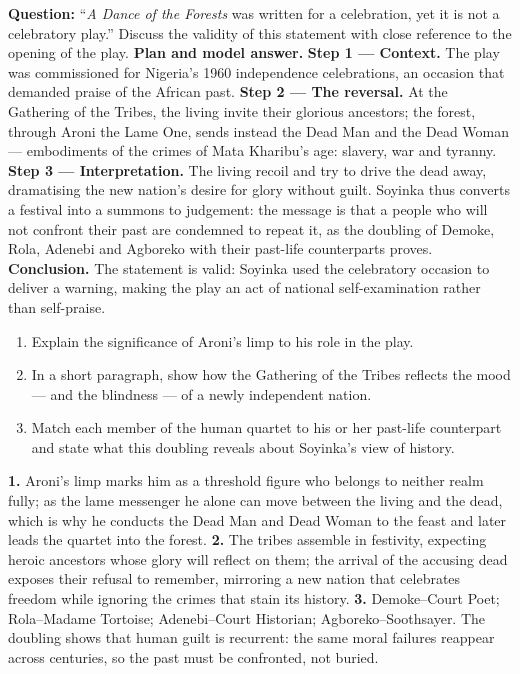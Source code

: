 \documentclass[11pt]{article}
\begin{document}
\begin{exoresolu}
\textbf{Question:} ``\emph{A Dance of the Forests} was written for a celebration, yet it is not a celebratory play.'' Discuss the validity of this statement with close reference to the opening of the play.
\tcblower
\textbf{Plan and model answer.} \textbf{Step 1 — Context.} The play was commissioned for Nigeria's 1960 independence celebrations, an occasion that demanded praise of the African past. \textbf{Step 2 — The reversal.} At the Gathering of the Tribes, the living invite their glorious ancestors; the forest, through Aroni the Lame One, sends instead the Dead Man and the Dead Woman — embodiments of the crimes of Mata Kharibu's age: slavery, war and tyranny. \textbf{Step 3 — Interpretation.} The living recoil and try to drive the dead away, dramatising the new nation's desire for glory without guilt. Soyinka thus converts a festival into a summons to judgement: the message is that a people who will not confront their past are condemned to repeat it, as the doubling of Demoke, Rola, Adenebi and Agboreko with their past-life counterparts proves. \textbf{Conclusion.} The statement is valid: Soyinka used the celebratory occasion to deliver a warning, making the play an act of national self-examination rather than self-praise.
\end{exoresolu}

\begin{exercice}[Practice]
\begin{enumerate}
\item Explain the significance of Aroni's limp to his role in the play.
\item In a short paragraph, show how the Gathering of the Tribes reflects the mood — and the blindness — of a newly independent nation.
\item Match each member of the human quartet to his or her past-life counterpart and state what this doubling reveals about Soyinka's view of history.
\end{enumerate}
\end{exercice}

\begin{corrige}[Exercise n°1]
\textbf{1.} Aroni's limp marks him as a threshold figure who belongs to neither realm fully; as the lame messenger he alone can move between the living and the dead, which is why he conducts the Dead Man and Dead Woman to the feast and later leads the quartet into the forest. \textbf{2.} The tribes assemble in festivity, expecting heroic ancestors whose glory will reflect on them; the arrival of the accusing dead exposes their refusal to remember, mirroring a new nation that celebrates freedom while ignoring the crimes that stain its history. \textbf{3.} Demoke--Court Poet; Rola--Madame Tortoise; Adenebi--Court Historian; Agboreko--Soothsayer. The doubling shows that human guilt is recurrent: the same moral failures reappear across centuries, so the past must be confronted, not buried.
\end{corrige}
\end{document}
